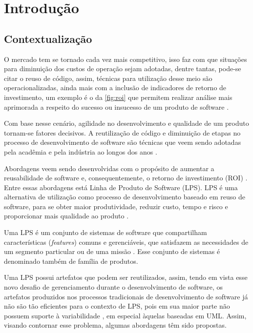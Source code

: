 \chapter{Introdução}
\label{cap1:introducao}
\pagestyle{plain}
\section{Contextualização}
O mercado tem se tornado cada vez mais competitivo, isso faz com que situações para diminuição dos custos de operação sejam adotadas, dentre tantas, pode-se citar o reuso de código, assim, técnicas para utilização desse meio são operacionalizadas, ainda mais com a inclusão de indicadores de retorno de investimento, um exemplo é o da \ref{fig:roi} que permitem realizar análise mais aprimorada a respeito do sucesso ou insucesso de um produto de software \cite{Weiss:1999:SPE:317887}. 

Com base nesse cenário, agilidade no desenvolvimento e qualidade de um produto tornam-se fatores decisivos. A reutilização de código e diminuição de etapas no processo de desenvolvimento de software são técnicas que veem sendo adotadas pela acadêmia e pela indústria ao longos dos anos \cite{delamaro2017introduccao}.

Abordagens veem sendo desenvolvidas com o propósito de aumentar a reusabilidade de software e, consequentemente, o retorno de investimento (ROI)  \cite{delamaro2017introduccao}. Entre essas abordagens está Linha de Produto de Software (LPS). LPS é uma alternativa de utilização como processo de desenvolvimento baseado em reuso de software, para se obter maior produtividade, reduzir custo, tempo e risco e proporcionar mais qualidade ao produto \cite{linden2007product}.

Uma LPS é um conjunto de sistemas de software que compartilham características (\textit{features}) comuns e gerenciáveis, que satisfazem as necessidades de um segmento particular ou de uma missão \cite{clements2002software}. Esse conjunto de sistemas é denominado também de família de produtos.

Uma LPS possui artefatos que podem ser reutilizados, assim, tendo em vista esse novo desafio de gerenciamento durante o desenvolvimento de software, os artefatos produzidos nos processos tradicionais de desenvolvimento de software já não são tão eficientes para o contexto de LPS, pois em sua maior parte não possuem suporte à variabilidade \cite{clements2002software}, em especial àquelas baseadas em UML. Assim, visando contornar esse problema, algumas abordagens têm sido propostas. 

